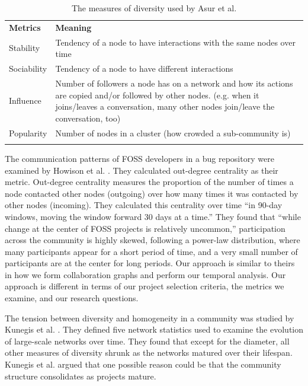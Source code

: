\documentclass{acm_proc_article-sp}
\begin{document}
\begin{table}[!htbp]
\caption{The measures of diversity used by Asur et al. \cite{Asur}}
\label{tableDiversityMeasuresAsurEtAl} 
\begin{tabular}{p{} p{}}
\hline\noalign{\smallskip}
\textbf{Metrics} & \textbf{Meaning} \\
\noalign{\smallskip}\hline\noalign{\smallskip}
Stability & Tendency of a node to have interactions with the same nodes over time \\ \hline
Sociability & Tendency of a node to have different interactions \\\hline
Influence & Number of followers a node has on a network and how its actions are copied and/or followed by other nodes. (e.g. when it joins/leaves a conversation, many other nodes join/leave the conversation, too) \\\hline
Popularity & Number of nodes in a cluster (how crowded a sub-community is) \\
\noalign{\smallskip}\hline
\end{tabular}
\end{table}

The communication patterns of FOSS developers in a bug repository were examined by Howison et al. \cite{HowisonSocialDynamics}. They calculated out-degree centrality as their metric. Out-degree centrality measures the proportion of the number of times a node contacted other nodes (outgoing) over how many times it was contacted by other nodes (incoming). They calculated this centrality over time ``in 90-day windows, moving the window forward 30 days at a time.'' They found that ``while change at the center of FOSS projects is relatively uncommon,'' participation across the community is highly skewed, following a power-law distribution, where many participants appear for a short period of time, and a very small number of participants are at the center for long periods. Our approach is similar to theirs in how we form collaboration graphs and perform our temporal analysis. Our approach is different in terms of our project selection criteria, the metrics we examine, and our research questions.

The tension between diversity and homogeneity in a community was studied by Kunegis et al. \cite{Kunegis}. They defined five network statistics used to examine the evolution of large-scale networks over time. They found that except for the diameter, all other measures of diversity shrunk as the networks matured over their lifespan. Kunegis et al. \cite{Kunegis} argued that one possible reason could be that the community structure consolidates as projects mature.
\end{document}
